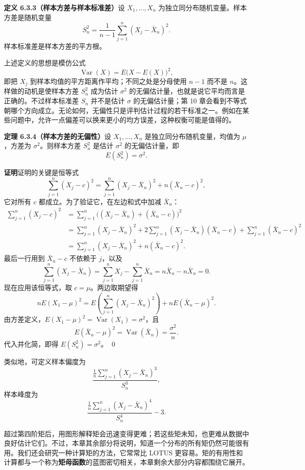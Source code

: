 \documentclass[UTF8, 12pt, fontset=fandol, oneside]{ctexart}
\begin{document}
\noindent\textbf{定义 6.3.3（样本方差与样本标准差）}\quad 设 $X_1,\ldots,X_n$ 为独立同分布随机变量。样本方差是随机变量
\[
  S_n^2=\frac1{n-1}\sum_{j=1}^n(X_j-\bar X_n)^2.
\]
样本标准差是样本方差的平方根。

上述定义的思想是模仿公式
\[
  \operatorname{Var}(X)=E\bigl(X-E(X)\bigr)^2,
\]
即把 $X_j$ 到样本均值的平方距离作平均；不同之处是分母使用 $n-1$ 而不是 $n$。这样做的动机是使样本方差 $S_n^2$ 成为估计 $\sigma^2$ 的无偏估计量，也就是说它平均而言是正确的。不过样本标准差 $S_n$ 并不是估计 $\sigma$ 的无偏估计量；第 10 章会看到不等式朝哪个方向成立。无论如何，无偏性只是评判估计过程的若干标准之一。例如在某些问题中，允许一点偏差可以换来更小的均方误差，这种权衡可能是值得的。

\noindent\textbf{定理 6.3.4（样本方差的无偏性）}\quad 设 $X_1,\ldots,X_n$ 是独立同分布随机变量，均值为 $\mu$，方差为 $\sigma^2$。则样本方差 $S_n^2$ 是估计 $\sigma^2$ 的无偏估计量，即
\[
  E(S_n^2)=\sigma^2.
\]

\noindent\textbf{证明}\quad 证明的关键是恒等式
\[
  \sum_{j=1}^n(X_j-c)^2
  =
  \sum_{j=1}^n(X_j-\bar X_n)^2+n(\bar X_n-c)^2,
\]
它对所有 $c$ 都成立。为了验证它，在左边和式中加减 $\bar X_n$：
\begin{align*}
  \sum_{j=1}^n(X_j-c)^2
  &=
  \sum_{j=1}^n\bigl((X_j-\bar X_n)+(\bar X_n-c)\bigr)^2\\
  &=
  \sum_{j=1}^n(X_j-\bar X_n)^2
  +2\sum_{j=1}^n(X_j-\bar X_n)(\bar X_n-c)
  +\sum_{j=1}^n(\bar X_n-c)^2\\
  &=
  \sum_{j=1}^n(X_j-\bar X_n)^2+n(\bar X_n-c)^2.
\end{align*}
最后一行用到 $\bar X_n-c$ 不依赖于 $j$，以及
\[
  \sum_{j=1}^n(X_j-\bar X_n)
  =
  \sum_{j=1}^nX_j-\sum_{j=1}^n\bar X_n
  =
  n\bar X_n-n\bar X_n=0.
\]
现在应用该恒等式，取 $c=\mu$。两边取期望得
\[
  nE(X_1-\mu)^2
  =
  E\left(\sum_{j=1}^n(X_j-\bar X_n)^2\right)
  +nE(\bar X_n-\mu)^2.
\]
由方差定义，$E(X_1-\mu)^2=\operatorname{Var}(X_1)=\sigma^2$，且
\[
  E(\bar X_n-\mu)^2=\operatorname{Var}(\bar X_n)=\frac{\sigma^2}{n}.
\]
代入并化简，即得 $E(S_n^2)=\sigma^2$。
\qed

类似地，可定义样本偏度为
\[
  \frac{\frac1n\sum_{j=1}^n(X_j-\bar X_n)^3}{S_n^3},
\]
样本峰度为
\[
  \frac{\frac1n\sum_{j=1}^n(X_j-\bar X_n)^4}{S_n^4}-3.
\]

超过第四阶矩后，用图形解释矩会迅速变得更难；若这些矩未知，也更难从数据中良好估计它们。不过，本章其余部分将说明，知道一个分布的所有矩仍然可能很有用。我们还会研究一种计算矩的方法，它常常比 LOTUS 更容易。矩的有用性和计算都与一个称为\textbf{矩母函数}的蓝图密切相关，本章剩余大部分内容都围绕它展开。
\end{document}
